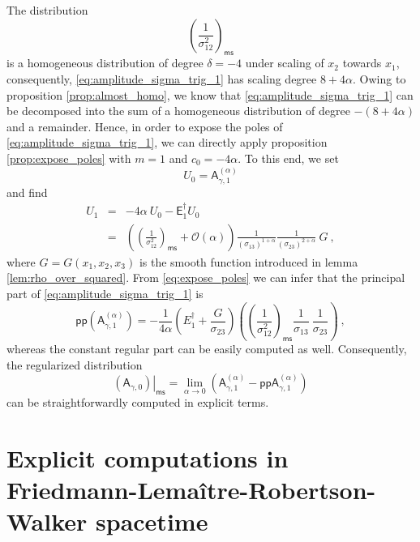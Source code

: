 \documentclass[11pt]{book}
\newcommand{\pp}{\mathsf{pp}}
\newcommand{\ms}{\mathsf{ms}}
\newcommand{\Ocal}{\mathcal{O}}
\newcommand{\Asf}{\mathsf{A}}
\newcommand{\Esf}{\mathsf{E}}
\theoremstyle{break}
\begin{document}
%
The distribution 
%
\begin{equation*}
\left(\frac{1}{\sigma^2_{12}}\right)_\ms 
\end{equation*}
%
is a homogeneous distribution of degree $\delta=-4$ under scaling of $x_2$ towards $x_1$, consequently, \eqref{eq:amplitude_sigma_trig_1} has scaling degree $8+4\alpha$. Owing to proposition \ref{prop:almost_homo}, we know that \eqref{eq:amplitude_sigma_trig_1} can be decomposed into the sum of a homogeneous distribution of degree $-(8+4\alpha)$ and a remainder. Hence, in order to expose the poles of \eqref{eq:amplitude_sigma_trig_1}, we can directly apply proposition \ref{prop:expose_poles} with $m=1$ and $c_0 = -4\alpha$. To this end, we set 
%
\begin{equation*}
U_0 = \Asf_{\gamma,1}^{(\alpha)}
\end{equation*}
%
and find 
%
\begin{eqnarray*}
U_1 &=& -4 \alpha \ U_0 - \Esf^\dagger_1 U_0 \\
&=& \left(\left(\frac{1}{\sigma_{12}^{2}} \right)_\ms + \Ocal(\alpha) \right) \frac{1}{(\sigma_{13})^{1+\alpha}} \frac{1}{(\sigma_{23})^{2+\alpha}} \ G \ ,
\end{eqnarray*}
%
where $G=G(x_1,x_2,x_3)$ is the smooth function introduced in lemma \ref{lem:rho_over_squared}. From \eqref{eq:expose_poles} we can infer that the principal part of \eqref{eq:amplitude_sigma_trig_1} is
%
\begin{equation*}
\pp\left(\Asf_{\gamma,1}^{(\alpha)}\right) = - \frac{1}{4\alpha} \left(E^\dagger_1 + \frac{G}{\sigma_{23}}\right) \left( \left(\frac{1}{\sigma_{12}^2}\right)_\ms \frac{1}{\sigma_{13}} \ \frac{1}{\sigma_{23}} \right) \ ,
\end{equation*}
%
whereas the constant regular part can be easily computed as well. Consequently, the regularized distribution
%
\begin{equation*}
\left.(\Asf_{\gamma,0})\right|_\ms = \lim_{\alpha\to 0} \left( \Asf_{\gamma,1}^{(\alpha)} - \pp \Asf_{\gamma,1}^{(\alpha)} \right)
\end{equation*}
%
can be straightforwardly computed in explicit terms.

\section{Explicit computations in Friedmann-Lemaître-Robertson-Walker spacetime}
\end{document}

